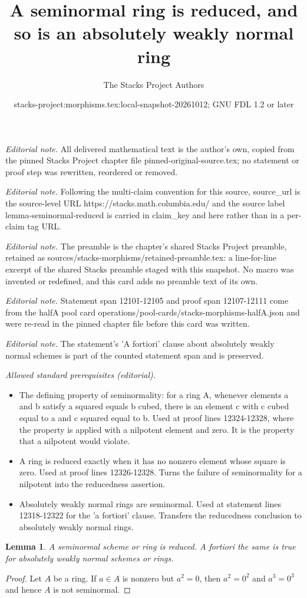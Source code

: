 \documentclass[10pt,a4paper]{amsart}
\title{A seminormal ring is reduced, and so is an absolutely weakly normal ring}
\author{The Stacks Project Authors}
\date{stacks-project:morphisms.tex:local-snapshot-20261012; GNU FDL 1.2 or later}
\theoremstyle{plain}
\newtheorem{lemma}[subsection]{Lemma}
\theoremstyle{definition}
\theoremstyle{remark}
\numberwithin{equation}{subsection}
\begin{document}
\maketitle
\noindent\textit{Editorial note.} All delivered mathematical text is the author's own, copied from the pinned Stacks Project chapter file pinned-original-source.tex; no statement or proof step was rewritten, reordered or removed.\par\medskip
\noindent\textit{Editorial note.} Following the multi-claim convention for this source, source\_url is the source-level URL https://stacks.math.columbia.edu/ and the source label lemma-seminormal-reduced is carried in claim\_key and here rather than in a per-claim tag URL.\par\medskip
\noindent\textit{Editorial note.} The preamble is the chapter's shared Stacks Project preamble, retained as sources/stacks-morphisms/retained-preamble.tex: a line-for-line excerpt of the shared Stacks preamble staged with this snapshot. No macro was invented or redefined, and this card adds no preamble text of its own.\par\medskip
\noindent\textit{Editorial note.} Statement span 12101-12105 and proof span 12107-12111 come from the halfA pool card operations/pool-cards/stacks-morphisms-halfA.json and were re-read in the pinned chapter file before this card was written.\par\medskip
\noindent\textit{Editorial note.} The statement's 'A fortiori' clause about absolutely weakly normal schemes is part of the counted statement span and is preserved.\par\medskip
\noindent\textit{Allowed standard prerequisites (editorial).}\begin{itemize}
\item The defining property of seminormality: for a ring A, whenever elements a and b satisfy a squared equals b cubed, there is an element c with c cubed equal to a and c squared equal to b. Used at proof lines 12324-12328, where the property is applied with a nilpotent element and zero. It is the property that a nilpotent would violate.
\item A ring is reduced exactly when it has no nonzero element whose square is zero. Used at proof lines 12326-12328. Turns the failure of seminormality for a nilpotent into the reducedness assertion.
\item Absolutely weakly normal rings are seminormal. Used at statement lines 12318-12322 for the 'a fortiori' clause. Transfers the reducedness conclusion to absolutely weakly normal rings.
\end{itemize}\medskip
\begin{lemma}
\label{lemma-seminormal-reduced}
A seminormal scheme or ring is reduced. A fortiori the same
is true for absolutely weakly normal schemes or rings.
\end{lemma}

\begin{proof}
Let $A$ be a ring.
If $a \in A$ is nonzero but $a^2 = 0$, then $a^2 = 0^2$ and
$a^3 = 0^3$ and hence $A$ is not seminormal.
\end{proof}
\end{document}
